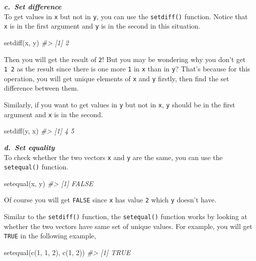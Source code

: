 \documentclass[
]{book}
\newenvironment{Shaded}{\begin{snugshade}}{\end{snugshade}}
\newcommand{\CommentTok}[1]{\textcolor[rgb]{0.56,0.35,0.01}{\textit{#1}}}
\newcommand{\DecValTok}[1]{\textcolor[rgb]{0.00,0.00,0.81}{#1}}
\newcommand{\FunctionTok}[1]{\textcolor[rgb]{0.00,0.00,0.00}{#1}}
\newcommand{\NormalTok}[1]{#1}
\begin{document}
\textbf{\emph{c.~Set difference}}\\
To get values in \texttt{x} but not in \texttt{y}, you can use the \texttt{setdiff()} function. Notice that \texttt{x} is in the first argument and \texttt{y} is in the second in this situation.

\begin{Shaded}
\begin{Highlighting}[]
\FunctionTok{setdiff}\NormalTok{(x, y)}
\CommentTok{\#\textgreater{} [1] 2}
\end{Highlighting}
\end{Shaded}

Then you will get the result of \texttt{2}! But you may be wondering why you don't get \texttt{1\ 2} as the result since there is one more \texttt{1} in \texttt{x} than in \texttt{y}? That's because for this operation, you will get unique elements of \texttt{x} and \texttt{y} firstly, then find the set difference between them.

Similarly, if you want to get values in \texttt{y} but not in \texttt{x}, \texttt{y} should be in the first argument and \texttt{x} is in the second.

\begin{Shaded}
\begin{Highlighting}[]
\FunctionTok{setdiff}\NormalTok{(y, x)}
\CommentTok{\#\textgreater{} [1] 4 5}
\end{Highlighting}
\end{Shaded}

\textbf{\emph{d.~Set equality}}\\
To check whether the two vectors \texttt{x} and \texttt{y} are the same, you can use the \texttt{setequal()} function.

\begin{Shaded}
\begin{Highlighting}[]
\FunctionTok{setequal}\NormalTok{(x, y)}
\CommentTok{\#\textgreater{} [1] FALSE}
\end{Highlighting}
\end{Shaded}

Of course you will get \texttt{FALSE} since \texttt{x} has value \texttt{2} which \texttt{y} doesn't have.

Similar to the \texttt{setdiff()} function, the \texttt{setequal()} function works by looking at whether the two vectors have same set of unique values. For example, you will get \texttt{TRUE} in the following example,

\begin{Shaded}
\begin{Highlighting}[]
\FunctionTok{setequal}\NormalTok{(}\FunctionTok{c}\NormalTok{(}\DecValTok{1}\NormalTok{, }\DecValTok{1}\NormalTok{, }\DecValTok{2}\NormalTok{), }\FunctionTok{c}\NormalTok{(}\DecValTok{1}\NormalTok{, }\DecValTok{2}\NormalTok{))}
\CommentTok{\#\textgreater{} [1] TRUE}
\end{Highlighting}
\end{Shaded}
\end{document}
